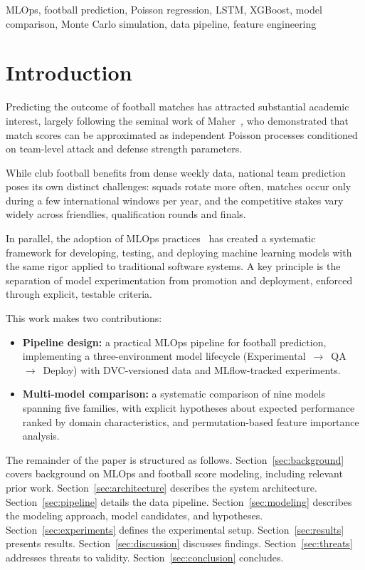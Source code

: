 \documentclass[conference]{IEEEtran}
\begin{document}
\begin{IEEEkeywords}
MLOps, football prediction, Poisson regression, LSTM, XGBoost, model comparison,
Monte Carlo simulation, data pipeline, feature engineering
\end{IEEEkeywords}

\section{Introduction}

Predicting the outcome of football matches has attracted substantial academic interest,
largely following the seminal work of Maher~\cite{maher1982modelling}, who
demonstrated that match scores can be approximated as independent Poisson processes
conditioned on team-level attack and defense strength parameters. 

While club football benefits from dense weekly data, national team prediction poses its own
distinct challenges: squads rotate more often, matches occur only during a few international 
windows per year, and the competitive stakes vary widely across friendlies, qualification rounds 
and finals.

In parallel, the adoption of MLOps practices~\cite{google_mlops} has created a systematic
framework for developing, testing, and deploying machine learning models with the same
rigor applied to traditional software systems. A key principle is the separation of model
experimentation from promotion and deployment, enforced through explicit, testable criteria.

This work makes two contributions:
\begin{itemize}
  \item \textbf{Pipeline design:} a practical MLOps pipeline for football prediction,
  implementing a three-environment model lifecycle (Experimental~$\to$~QA~$\to$~Deploy)
  with DVC-versioned data and MLflow-tracked experiments.
  \item \textbf{Multi-model comparison:} a systematic comparison of nine models spanning
  five families, with explicit hypotheses about expected performance ranked by domain
  characteristics, and permutation-based feature importance analysis.
\end{itemize}

The remainder of the paper is structured as follows.
Section~\ref{sec:background} covers background on MLOps and football score modeling, including relevant prior work.
Section~\ref{sec:architecture} describes the system architecture.
Section~\ref{sec:pipeline} details the data pipeline.
Section~\ref{sec:modeling} describes the modeling approach, model candidates, and hypotheses.
Section~\ref{sec:experiments} defines the experimental setup.
Section~\ref{sec:results} presents results.
Section~\ref{sec:discussion} discusses findings.
Section~\ref{sec:threats} addresses threats to validity.
Section~\ref{sec:conclusion} concludes.
\end{document}
